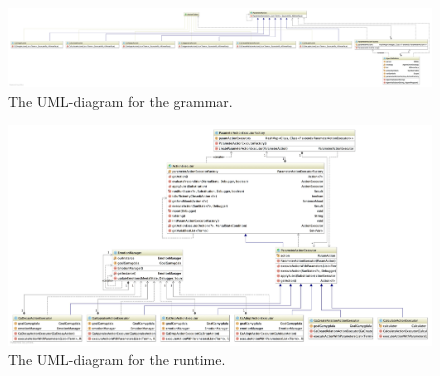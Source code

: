 \begin{figure}
\includegraphics[width=\linewidth]{diagram-grammar}
\caption{The UML-diagram for the grammar.}
\end{figure}

\begin{figure}
\includegraphics[width=\linewidth]{diagram-runtime}
\caption{The UML-diagram for the runtime.}
\end{figure}